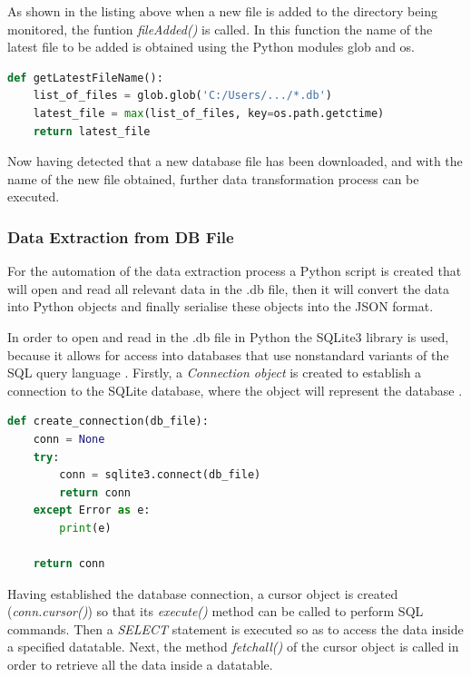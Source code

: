 As shown in the listing above when a new file is added to the directory being monitored, the funtion \textit{fileAdded()} is called. In this function the name of the latest file to be added is obtained using the Python modules glob and os. 

\begin{lstlisting}[language=Python, caption={Getting The Latest File Name Code Snippet}, label={lst:latestFile}]
def getLatestFileName():
    list_of_files = glob.glob('C:/Users/.../*.db')
    latest_file = max(list_of_files, key=os.path.getctime)
    return latest_file
\end{lstlisting}

Now having detected that a new database file has been downloaded, and with the name of the new file obtained, further data transformation process can be executed. 

\subsubsection{Data Extraction from DB File}

For the automation of the data extraction process a Python script is created that will open and read all relevant data in the .db file, then it will convert the data into Python objects and finally serialise these objects into the JSON format. 

In order to open and read in the .db file in Python the SQLite3 library is used, because it allows for access into databases that use nonstandard variants of the SQL query language \cite{sqlite3}. Firstly, a \textit{Connection object} is created to establish a connection to the SQLite database, where the object will represent the database \cite{sqlitePython1}. 

\begin{lstlisting}[language=Python, caption={SQLite3 Database Connection Object Code Snippet}, label={lst:Connection Object}]
def create_connection(db_file): 
    conn = None
    try:
        conn = sqlite3.connect(db_file) 
        return conn
    except Error as e:
        print(e)
    
    return conn
\end{lstlisting}

Having established the database connection, a cursor object is created (\textit{conn.cursor()}) so that its \textit{execute()} method can be called to perform SQL commands. Then a \textit{SELECT} statement is executed so as to access the data inside a specified datatable. Next, the method \textit{fetchall()} of the cursor object is called in order to retrieve all the data inside a datatable. 

